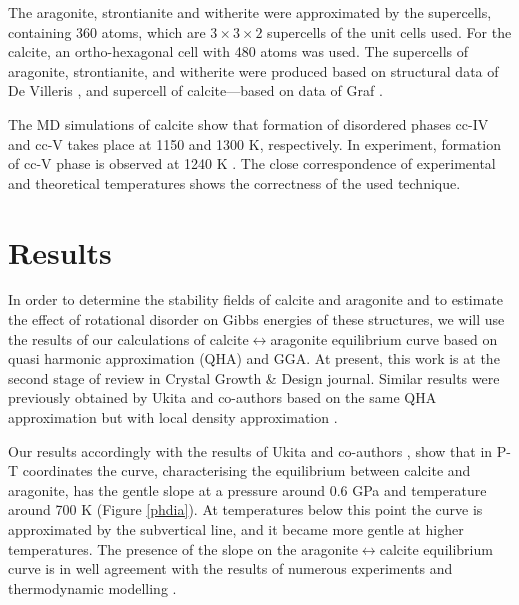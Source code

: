 \documentclass[journal=jacsat,manuscript=article]{achemso}
\begin{document}
The aragonite, strontianite and witherite were approximated by the supercells, containing 360 atoms, which are $3 \times 3 \times 2$ supercells of the unit cells used. For the calcite, an ortho-hexagonal cell with 480 atoms was used. The supercells of aragonite, strontianite, and witherite were produced based on structural data of De Villeris \cite{srco3}, and supercell of calcite---based on data of Graf \cite{calcite}.


The MD simulations of calcite show that formation of disordered phases cc-IV and cc-V takes place at 1150 and 1300 K, respectively. In experiment, formation of cc-V phase is observed at 1240 K \cite{ishizawa2013}. The close correspondence of experimental and theoretical temperatures shows the correctness of the used technique. 





			\section{Results}
In order to determine the stability fields of calcite and aragonite and to estimate the effect of rotational disorder on Gibbs energies of these structures, we will use the results of our calculations of calcite$\leftrightarrow$aragonite equilibrium curve based on quasi harmonic approximation (QHA) and GGA. At present, this work is at the second stage of review in Crystal Growth \& Design journal. Similar results were previously obtained by Ukita and co-authors based on the same QHA approximation but with local density approximation \cite{ukita2016}.

Our results accordingly with the results of Ukita and co-authors \cite{ukita2016}, show that in P-T coordinates the curve, characterising the equilibrium between calcite and aragonite, has the gentle slope at a pressure around 0.6 GPa and temperature around 700 K (Figure \ref{phdia}). 
At temperatures below this point the curve is approximated by the subvertical line, and it became more gentle at higher temperatures.
The presence of the slope on the aragonite$\leftrightarrow$calcite equilibrium curve is in well agreement with the results of numerous experiments and thermodynamic modelling \cite{mirwald1976, redfern2000}. 
\end{document}
